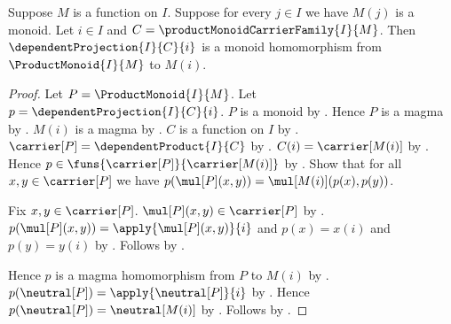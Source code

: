 \begin{theorem}\label{product_monoid_projection_hom}
    Suppose $M$ is a function on $I$.
    Suppose for every $j\in I$ we have $M(j)$ is a monoid.
    Let $i\in I$ and $C=\productMonoidCarrierFamily{I}{M}$.
    Then $\dependentProjection{I}{C}{i}$ is a monoid homomorphism from
        $\ProductMonoid{I}{M}$ to $M(i)$.
\end{theorem}
\begin{proof}
    Let $P=\ProductMonoid{I}{M}$.
    Let $p=\dependentProjection{I}{C}{i}$.
    $P$ is a monoid by .
    Hence $P$ is a magma by .
    $M(i)$ is a magma by .
    $C$ is a function on $I$ by
        .
    $\carrier[P]=\dependentProduct{I}{C}$ by
        .
    $C(i)=\carrier[M(i)]$ by
        .
    Hence $p\in\funs{\carrier[P]}{\carrier[M(i)]}$ by
        .
    Show that for all $x,y\in\carrier[P]$ we have
        $p(\mul[P](x,y))=\mul[M(i)](p(x),p(y))$.
    \begin{subproof}
        Fix $x,y\in\carrier[P]$.
        $\mul[P](x,y)\in\carrier[P]$ by
            .
        $p(\mul[P](x,y))=\apply{\mul[P](x,y)}{i}$ and
            $p(x)=x(i)$ and $p(y)=y(i)$ by
            .
        Follows by .
    \end{subproof}
    Hence $p$ is a magma homomorphism from $P$ to $M(i)$ by
        .
    $p(\neutral[P])=\apply{\neutral[P]}{i}$ by
        .
    Hence $p(\neutral[P])=\neutral[M(i)]$ by
        .
    Follows by .
\end{proof}

